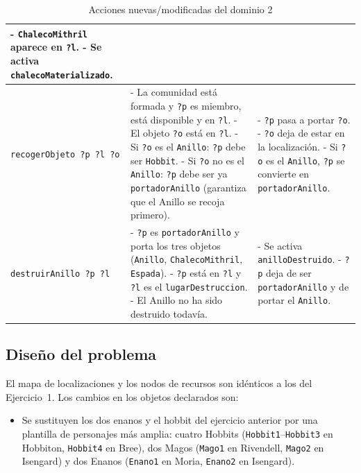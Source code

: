 \documentclass[10pt]{article}
\begin{document}
\begin{table}[H]
\begin{tabular}{| m{4cm} | m{6cm} | m{6cm} |}
        - \texttt{ChalecoMithril} aparece en \texttt{?l}. \newline
        - Se activa \texttt{chalecoMaterializado}. \\
        \hline
        \texttt{recogerObjeto ?p ?l ?o} &
        - La comunidad está formada y \texttt{?p} es miembro, está disponible y en \texttt{?l}. \newline
        - El objeto \texttt{?o} está en \texttt{?l}. \newline
        - Si \texttt{?o} es el \texttt{Anillo}: \texttt{?p} debe ser \texttt{Hobbit}. \newline
        - Si \texttt{?o} no es el \texttt{Anillo}: \texttt{?p} debe ser ya \texttt{portadorAnillo} (garantiza que el Anillo se recoja primero). &
        - \texttt{?p} pasa a portar \texttt{?o}. \newline
        - \texttt{?o} deja de estar en la localización. \newline
        - Si \texttt{?o} es el \texttt{Anillo}, \texttt{?p} se convierte en \texttt{portadorAnillo}. \\
        \hline
        \texttt{destruirAnillo ?p ?l} &
        - \texttt{?p} es \texttt{portadorAnillo} y porta los tres objetos (\texttt{Anillo}, \texttt{ChalecoMithril}, \texttt{Espada}). \newline
        - \texttt{?p} está en \texttt{?l} y \texttt{?l} es el \texttt{lugarDestruccion}. \newline
        - El Anillo no ha sido destruido todavía. &
        - Se activa \texttt{anilloDestruido}. \newline
        - \texttt{?p} deja de ser \texttt{portadorAnillo} y de portar el \texttt{Anillo}. \\
        \hline
    \end{tabular}
    \caption{Acciones nuevas/modificadas del dominio 2}
    \label{tab:acciones_dom2}
\end{table}

\subsection{Diseño del problema}

El mapa de localizaciones y los nodos de recursos son idénticos a los del Ejercicio~1. Los cambios en los objetos declarados son:
\begin{itemize}[label=-]
    \item Se sustituyen los dos enanos y el hobbit del ejercicio anterior por una plantilla de personajes más amplia: cuatro Hobbits (\texttt{Hobbit1}--\texttt{Hobbit3} en Hobbiton, \texttt{Hobbit4} en Bree), dos Magos (\texttt{Mago1} en Rivendell, \texttt{Mago2} en Isengard) y dos Enanos (\texttt{Enano1} en Moria, \texttt{Enano2} en Isengard).
\end{itemize}
\end{document}
